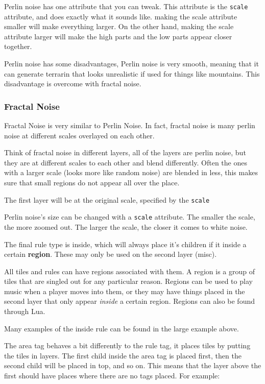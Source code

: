 \documentclass{book}
\begin{document}
Perlin noise has one attribute that you can tweak. This attribute is the \texttt{scale} attribute, and does exactly what it sounds like. making the scale attribute smaller will make everything larger. On the other hand, making the scale attribute larger will make the high parts and the low parts appear closer together.

Perlin noise has some disadvantages, Perlin noise is very smooth, meaning that it can generate terrarin that looks unrealistic if used for things like mountains. This disadvantage is overcome with fractal noise.

\subsubsection{Fractal Noise}
Fractal Noise is very similar to Perlin Noise. In fact, fractal noise is many perlin noise at different scales overlayed on each other.

Think of fractal noise in different layers, all of the layers are perlin noise, but they are at different scales to each other and blend differently. Often the ones with a larger scale (looks more like random noise) are blended in less, this makes sure that small regions do not appear all over the place.

The first layer will be at the original scale, specified by the \texttt{scale}

Perlin noise's size can be changed with a \texttt{scale} attribute. The smaller the scale, the more zoomed out. The larger the scale, the closer it comes to white noise.

The final rule type is inside, which will always place it's children if it inside a certain \textbf{region}. These may only be used on the second layer (misc).

All tiles and rules can have regions associated with them. A region is a group of tiles that are singled out for any particular reason. Regions can be used to play music when a player moves into them, or they may have things placed in the second layer that only appear \textit{inside} a certain region. Regions can also be found through Lua.

Many examples of the inside rule can be found in the large example above.

The area tag behaves a bit differently to the rule tag, it places tiles by putting the tiles in layers. The first child inside the area tag is placed first, then the second child will be placed in top, and so on. This means that the layer above the first should have places where there are no tags placed. For example:
\end{document}
